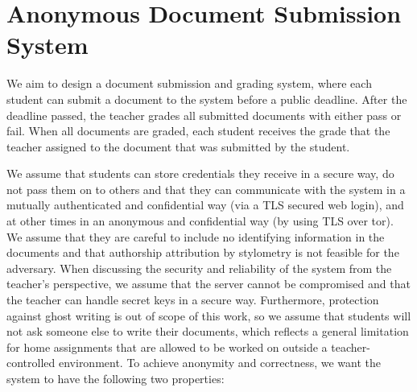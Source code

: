 \section{Anonymous Document Submission System}
    \label{section:document-submission-system:anonymous-document-submission-system}

We aim to design a document submission and grading system, 
%
where each student can submit a document to the system before a public
deadline. After the deadline passed, the teacher %
grades all submitted
documents with either pass or fail. When all documents are graded, each
student receives the grade that the teacher assigned to the document
that was submitted by the student.

We assume that students can store credentials they receive in a secure
way, do not pass them on to others and that they can communicate with
the system in a mutually authenticated and confidential way (\eg via a TLS
secured web login), and at other times in an anonymous and confidential 
way (\eg by using TLS over \acs{tor}\cite{dingledine_tor_2004}).
We assume that they are careful to include no identifying information in
the documents and that authorship attribution by stylometry is not
feasible for the adversary.
When discussing the security and reliability of the system from the
teacher's perspective, we assume that the server cannot be compromised
and that the teacher can handle secret keys in a secure way.
Furthermore, protection against ghost writing is out of scope of this
work, so we assume that students will not ask someone else to write
their documents, which reflects a general limitation for home
assignments that are allowed to be worked on outside a
teacher-controlled environment.
%
To achieve anonymity and correctness, we want the system to have the
following two properties:
	
